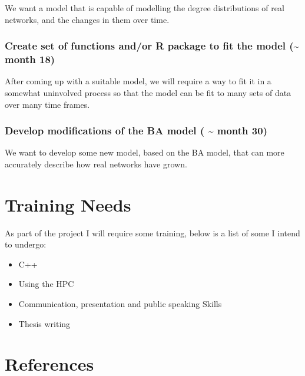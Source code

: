 \documentclass[
]{article}
\providecommand{\tightlist}{%
  \setlength{\itemsep}{0pt}\setlength{\parskip}{0pt}}\usepackage{longtable,booktabs,array}
\begin{document}
We want a model that is capable of modelling the degree distributions of
real networks, and the changes in them over time.

\subsubsection*{Create set of functions and/or R package to fit the
model (\textasciitilde{} month
18)}\label{create-set-of-functions-andor-r-package-to-fit-the-model-month-18}

After coming up with a suitable model, we will require a way to fit it
in a somewhat uninvolved process so that the model can be fit to many
sets of data over many time frames.

\subsubsection*{Develop modifications of the BA model (
\textasciitilde{} month
30)}\label{develop-modifications-of-the-ba-model-month-30}

We want to develop some new model, based on the BA model, that can more
accurately describe how real networks have grown.

\section{Training Needs}\label{training-needs}

As part of the project I will require some training, below is a list of
some I intend to undergo:

\begin{itemize}
\tightlist
\item
  C++
\item
  Using the HPC
\item
  Communication, presentation and public speaking Skills
\item
  Thesis writing
\end{itemize}

\section*{References}\label{references}
\end{document}
